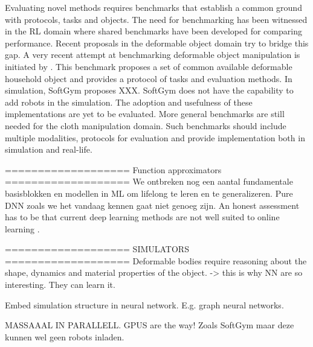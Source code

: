 \documentclass[\home/main.tex]{subfiles}
\begin{document}
Evaluating novel methods requires benchmarks that establish a common ground with protocols, tasks and objects. The need for benchmarking has been witnessed in the RL domain where shared benchmarks have been developed \autocite{brockman2016openai} for comparing performance. Recent proposals in the deformable object domain try to bridge this gap. A very recent attempt at benchmarking deformable object manipulation is initiated by \autocite{garciacamacho2021household}. This benchmark proposes a set of common available deformable household object and provides a protocol of tasks and evaluation methods. In simulation, SoftGym proposes XXX. SoftGym does not have the capability to add robots in the simulation. 
The adoption and usefulness of these implementations are yet to be evaluated. More general benchmarks are still needed for the cloth manipulation domain. Such benchmarks should include multiple modalities, protocols for evaluation and provide implementation both in simulation and real-life. 

===================
Function approximators 
===================
We ontbreken nog een aantal fundamentale basisblokken en modellen in ML om lifelong te leren en te generalizeren. Pure DNN zoals we het vandaag kennen gaat niet genoeg zijn.  
An honest assessment has to be that current deep learning methods are not well suited to online learning \autocite{Sutton2018}. %

===================
SIMULATORS 
===================
Deformable bodies require reasoning about the shape, dynamics and material properties of the object. -> this is why NN are so interesting. They can learn it.

Embed simulation structure in neural network. E.g. graph neural networks.  

MASSAAAL IN PARALLELL. GPUS are the way! Zoals SoftGym maar deze kunnen wel geen robots inladen. 

\end{document}
